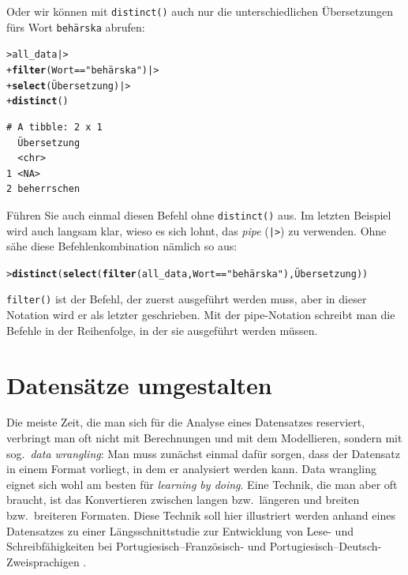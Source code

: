 \documentclass[oneside, 10pt]{book}\usepackage[]{graphicx}\usepackage[]{xcolor}
\makeatletter
\newcommand{\hlstr}[1]{\textcolor[rgb]{0.192,0.494,0.8}{#1}}%
\newcommand{\hlopt}[1]{\textcolor[rgb]{0,0,0}{#1}}%
\newcommand{\hlstd}[1]{\textcolor[rgb]{0.345,0.345,0.345}{#1}}%
\newcommand{\hlkwd}[1]{\textcolor[rgb]{0.737,0.353,0.396}{\textbf{#1}}}%
\newenvironment{kframe}{%
 \def\at@end@of@kframe{}%
 \ifinner\ifhmode%
  \def\at@end@of@kframe{\end{minipage}}%
  \begin{minipage}{\columnwidth}%
 \fi\fi%
 \def\FrameCommand##1{\hskip\@totalleftmargin \hskip-\fboxsep
 \colorbox{shadecolor}{##1}\hskip-\fboxsep
     \hskip-\linewidth \hskip-\@totalleftmargin \hskip\columnwidth}%
 \MakeFramed {\advance\hsize-\width
   \@totalleftmargin\z@ \linewidth\hsize
   \@setminipage}}%
 {\par\unskip\endMakeFramed%
 \at@end@of@kframe}
\newenvironment{knitrout}{}{} %
\makeatother
\begin{document}
Oder wir können mit \texttt{distinct()} auch nur die unterschiedlichen Übersetzungen
fürs Wort \texttt{behärska} abrufen:
\begin{knitrout}
\color{fgcolor}\begin{kframe}
\begin{alltt}
\hlstd{> }\hlstd{all_data |>}
\hlstd{+ }  \hlkwd{filter}\hlstd{(Wort} \hlopt{==} \hlstr{"behärska"}\hlstd{) |>}
\hlstd{+ }  \hlkwd{select}\hlstd{(Übersetzung) |>}
\hlstd{+ }  \hlkwd{distinct}\hlstd{()}
\end{alltt}
\begin{verbatim}
# A tibble: 2 x 1
  Übersetzung
  <chr>      
1 <NA>       
2 beherrschen
\end{verbatim}
\end{kframe}
\end{knitrout}

Führen Sie auch einmal diesen Befehl ohne \texttt{distinct()} aus.
Im letzten Beispiel wird auch langsam klar, wieso es sich lohnt,
das \textit{pipe} (\texttt{|>}) zu verwenden. Ohne sähe
diese Befehlenkombination nämlich so aus:
\begin{knitrout}
\color{fgcolor}\begin{kframe}
\begin{alltt}
\hlstd{> }\hlkwd{distinct}\hlstd{(}\hlkwd{select}\hlstd{(}\hlkwd{filter}\hlstd{(all_data, Wort} \hlopt{==} \hlstr{"behärska"}\hlstd{), Übersetzung))}
\end{alltt}
\end{kframe}
\end{knitrout}

\texttt{filter()} ist der Befehl,
der zuerst ausgeführt werden muss,
aber in dieser Notation wird er als letzter geschrieben.
Mit der pipe-Notation schreibt man die Befehle in der
Reihenfolge, in der sie ausgeführt werden müssen.

\section{Datensätze umgestalten}\label{sec:pivot}
Die meiste Zeit, die man sich für die Analyse eines Datensatzes
reserviert, verbringt man oft nicht mit Berechnungen und mit dem Modellieren,
sondern mit sog.\ \textit{data wrangling}: Man muss zunächst einmal
dafür sorgen, dass der Datensatz in einem Format vorliegt, in dem er
analysiert werden kann. Data wrangling eignet sich wohl am besten
für \textit{learning by doing}. Eine Technik, die man aber oft braucht,
ist das Konvertieren zwischen langen bzw.\ längeren und breiten bzw.\ breiteren
Formaten. Diese Technik soll hier illustriert werden anhand eines Datensatzes
zu einer Längsschnittstudie zur Entwicklung von Lese- und Schreibfähigkeiten
bei Portugiesisch--Französisch- und Portugiesisch--Deutsch-Zwei\-sprachigen
\citep{Lambelet_HELASCOT_writing,Pestana_HELASCOT_reading}.
\end{document}
